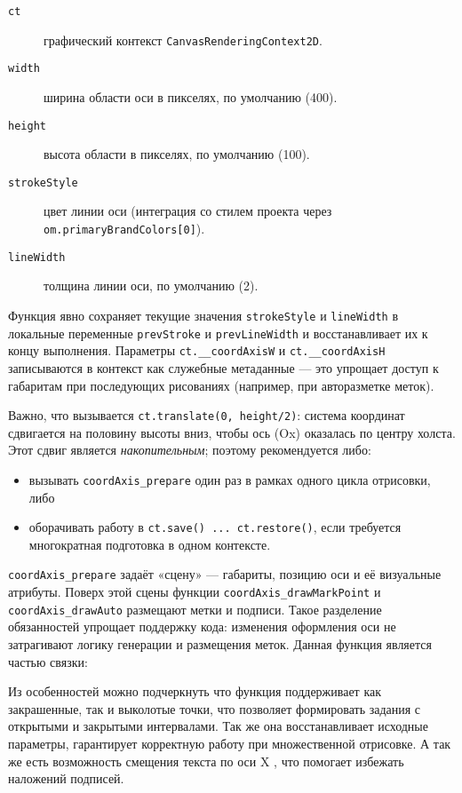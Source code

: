  

\begin{description}
  \item[\texttt{ct}] графический контекст \verb|CanvasRenderingContext2D|.
  \item[\texttt{width}] ширина области оси в пикселях, по умолчанию (400).
  \item[\texttt{height}] высота области в пикселях, по умолчанию (100).
  \item[\texttt{strokeStyle}] цвет линии оси (интеграция со стилем проекта через \verb|om.primaryBrandColors[0]|).
  \item[\texttt{lineWidth}] толщина линии оси, по умолчанию (2).
\end{description}

Функция явно сохраняет текущие значения \verb|strokeStyle| и \verb|lineWidth| в локальные переменные
\verb|prevStroke| и \verb|prevLineWidth| и восстанавливает их к концу выполнения.  
Параметры \verb|ct.__coordAxisW| и \verb|ct.__coordAxisH| записываются в контекст как служебные метаданные — это упрощает доступ к габаритам при последующих рисованиях (например, при авторазметке меток).

Важно, что вызывается \verb|ct.translate(0, height/2)|: система координат сдвигается на половину высоты вниз, чтобы ось (Ox) оказалась по центру холста. Этот сдвиг является \emph{накопительным}; поэтому рекомендуется либо:
\begin{itemize}
  \item вызывать \verb|coordAxis_prepare| один раз в рамках одного цикла отрисовки, либо
  \item оборачивать работу в \verb|ct.save() ... ct.restore()|, если требуется многократная подготовка в одном контексте.
\end{itemize}

\verb|coordAxis_prepare| задаёт «сцену» — габариты, позицию оси и её визуальные атрибуты. Поверх этой сцены функции \verb|coordAxis_drawMarkPoint| и \verb|coordAxis_drawAuto| размещают метки и подписи.
 Такое разделение обязанностей упрощает поддержку кода: изменения оформления оси не затрагивают логику генерации и размещения меток.
Данная функция является частью связки:
    
Из особенностей можно подчеркнуть что функция поддерживает как закрашенные, так и выколотые точки, что позволяет формировать задания с открытыми и закрытыми интервалами.
Так же она восстанавливает исходные параметры, гарантирует корректную работу при множественной отрисовке. А так же есть возможность смещения текста по оси X , что помогает избежать наложений подписей.
 


